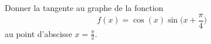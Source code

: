 
\begin{exercice}\label{exoOutilsMath-0048}

    Donner la tangente au graphe de la fonction
    \begin{equation}
        f(x)=\cos(x)\sin\big( x+\frac{ \pi }{4} \big)
    \end{equation}
    au point d'abscisse $x=\frac{ \pi }{2}$.

\end{exercice}
